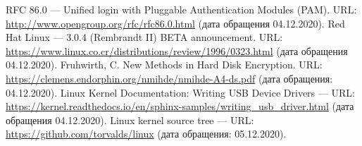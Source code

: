 
\begin{thebibliography}{3}
 RFC 86.0 — Unified login with Pluggable Authentication Modules (PAM). URL: \url{http://www.opengroup.org/rfc/rfc86.0.html} (дата обращения 04.12.2020).
 Red Hat Linux — 3.0.4 (Rembrandt II) BETA announcement. URL: \url{https://www.linux.co.cr/distributions/review/1996/0323.html} (дата обращения 04.12.2020).
 Fruhwirth, C. New Methods in Hard Disk Encryption. URL: \url{https://clemens.endorphin.org/nmihde/nmihde-A4-ds.pdf} (дата обращения: 04.12.2020).
 Linux Kernel Documentation: Writing USB Device Drivers — URL: \url{https://kernel.readthedocs.io/en/sphinx-samples/writing_usb_driver.html} (дата обращения 04.12.2020).
 Linux kernel source tree — URL: \url{https://github.com/torvalds/linux} (дата обращения: 05.12.2020).
\end{thebibliography}
